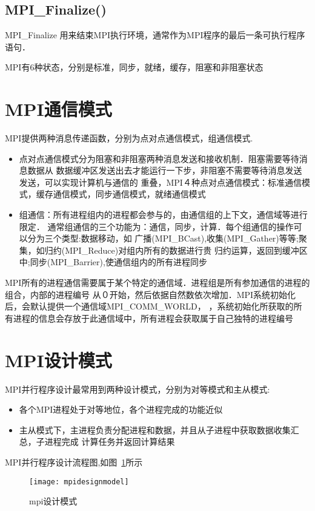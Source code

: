 \subsection{MPI\_Finalize()}
    MPI\_Finalize 用来结束MPI执行环境，通常作为MPI程序的最后一条可执行程序语句．

MPI有6种状态，分别是标准，同步，就绪，缓存，阻塞和非阻塞状态

\section{MPI通信模式}
    MPI提供两种消息传递函数，分别为点对点通信模式，组通信模式.
    \begin{itemize} 
    \item 点对点通信模式分为阻塞和非阻塞两种消息发送和接收机制．阻塞需要等待消息数据从
数据缓冲区发送出去才能运行一下步，非阻塞不需要等待消息发送发送，可以实现计算机与通信的
重叠，MPI４种点对点通信模式：标准通信模式，缓存通信模式，同步通信模式，就绪通信模式
    \item 组通信：所有进程组内的进程都会参与的，由通信组的上下文，通信域等进行限定．
通常组通信的三个功能为：通信，同步，计算．每个组通信的操作可以分为三个类型:数据移动，如
广播(MPI\_BCast),收集(MPI\_Gather)等等;聚集，如归约(MPI\_Reduce)对组内所有的数据进行贵
归约运算，返回到缓冲区中;同步(MPI\_Barrier),使通信组内的所有进程同步
    \end{itemize} 
    
    MPI所有的进程通信需要属于某个特定的通信域．进程组是所有参加通信的进程的组合，内部的进程编号
从０开始，然后依据自然数依次增加．MPI系统初始化后，会默认提供一个通信域MPI\_COMM\_WORLD，
，系统初始化所获取的所有进程的信息会存放于此通信域中，所有进程会获取属于自己独特的进程编号


\section{MPI设计模式}
    MPI并行程序设计最常用到两种设计模式，分别为对等模式和主从模式:
    \begin{itemize}
    \item 各个MPI进程处于对等地位，各个进程完成的功能近似
    \item 主从模式下，主进程负责分配进程和数据，并且从子进程中获取数据收集汇总，子进程完成
计算任务并返回计算结果
    \end{itemize}
    
    MPI并行程序设计流程图,如图~\ref{fig:mpidesignmodel}所示

    \begin{figure}[htbp]
    \centering
    \texttt{[image: mpidesignmodel]}
    \caption{mpi设计模式}\label{fig:mpidesignmodel}
    \vspace{\baselineskip}
    \end{figure}

